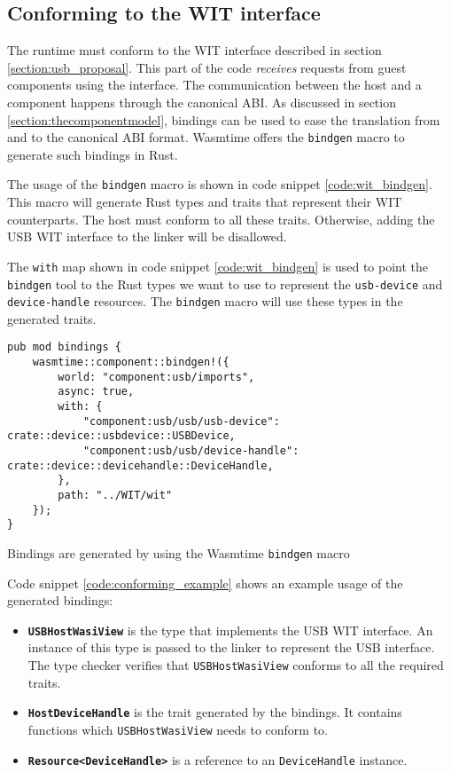 \subsection{Conforming to the \acrshort{WIT} interface}
The runtime must conform to the \acrshort{WIT} interface described in section \ref{section:usb_proposal}. This part of the code \textit{receives} requests from guest components using the interface. The communication between the host and a component happens through the canonical ABI. As discussed in section \ref{section:thecomponentmodel}, bindings can be used to ease the translation from and to the canonical ABI format. Wasmtime offers the \texttt{bindgen} macro \cite{wasmtime_component_bindgen} to generate such bindings in Rust.

The usage of the \texttt{bindgen} macro is shown in code snippet \ref{code:wit_bindgen}.
This macro will generate Rust types and traits that represent their \acrshort{WIT} counterparts. The host must conform to all these traits. Otherwise, adding the \acrshort{USB} \acrshort{WIT} interface to the linker will be disallowed.

The \texttt{with} map shown in code snippet \ref{code:wit_bindgen} is used to point the \texttt{bindgen} tool to the Rust types we want to use to represent the \texttt{usb-device} and \texttt{device-handle} resources. The \texttt{bindgen} macro will use these types in the generated traits.

\begin{code}
\begin{verbatim}
pub mod bindings {
	wasmtime::component::bindgen!({
		world: "component:usb/imports",
		async: true,
		with: {
			"component:usb/usb/usb-device": crate::device::usbdevice::USBDevice,
			"component:usb/usb/device-handle": crate::device::devicehandle::DeviceHandle,
		},
		path: "../WIT/wit"
	});
}
\end{verbatim} 
\caption{Bindings are generated by using the Wasmtime \texttt{bindgen} macro}
\label{code:wit_bindgen}
\end{code}

Code snippet \ref{code:conforming_example} shows an example usage of the generated bindings:
\begin{itemize}
\item \textbf{\texttt{USBHostWasiView}} is the type that implements the \acrshort{USB} \acrshort{WIT} interface. An instance of this type is passed to the linker to represent the \acrshort{USB} interface. The type checker verifies that \texttt{USBHostWasiView} conforms to all the required traits.
\item \textbf{\texttt{HostDeviceHandle}} is the trait generated by the bindings. It contains functions which \texttt{USBHostWasiView} needs to conform to.
\item \textbf{\texttt{Resource<DeviceHandle>}} is a reference to an \texttt{DeviceHandle} instance. 
\end{itemize}

